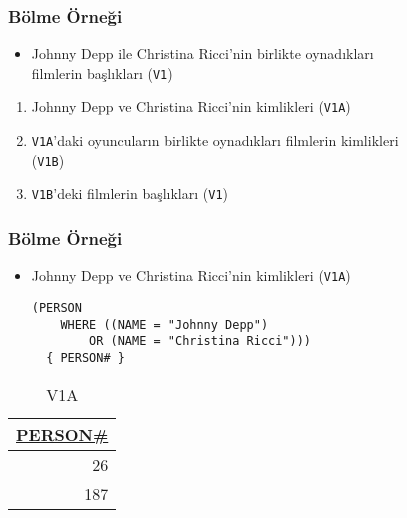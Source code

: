 \documentclass[dvipsnames]{beamer}
\theoremstyle{plain}
\begin{document}
\begin{frame}
  \frametitle{Bölme Örneği}

    \begin{itemize}
      \item Johnny Depp ile Christina Ricci'nin birlikte oynadıkları\\
        filmlerin başlıkları (\texttt{V1})
    \end{itemize}

    \pause
    \begin{enumerate}
      \item Johnny Depp ve Christina Ricci'nin kimlikleri (\texttt{V1A})
      \item \texttt{V1A}'daki oyuncuların birlikte oynadıkları filmlerin
        kimlikleri\\
        (\texttt{V1B})
      \item \texttt{V1B}'deki filmlerin başlıkları (\texttt{V1})
    \end{enumerate}
\end{frame}

\begin{frame}[fragile]
  \frametitle{Bölme Örneği}
 
    \begin{itemize}
      \item Johnny Depp ve Christina Ricci'nin kimlikleri (\texttt{V1A})

    \begin{lstlisting}
(PERSON
    WHERE ((NAME = "Johnny Depp")
        OR (NAME = "Christina Ricci")))
  { PERSON# }
    \end{lstlisting}
   \end{itemize}

    \vspace{-10pt}
    \begin{tiny}
    \begin{table}
      \caption{V1A}
      \begin{tabular}{|r|}\hline
\underline{PERSON\#}\\[2pt]\hline\hline
                  26\\\hline
                 187\\\hline
      \end{tabular}
    \end{table}
    \end{tiny}
\end{frame}
\end{document}
